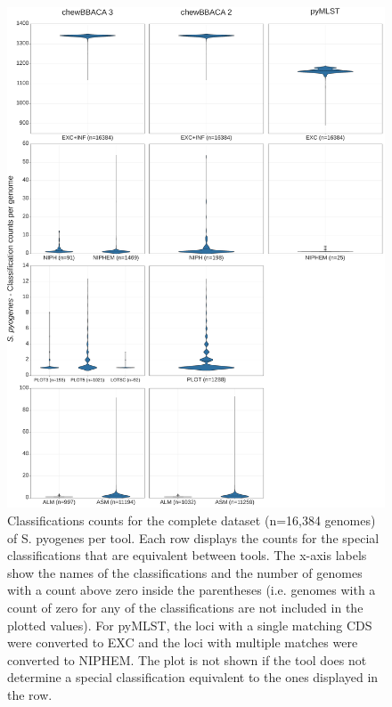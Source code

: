 \newpage
\begin{figure}[h!]
    \centering
    \includegraphics[angle=0,width=\textwidth]{figures/chapter 2/FigureS17.pdf}
    \caption{Classifications counts for the complete dataset (n=16,384 genomes) of S. pyogenes per tool. Each row displays the counts for the special classifications that are equivalent between tools. The x-axis labels show the names of the classifications and the number of genomes with a count above zero inside the parentheses (i.e. genomes with a count of zero for any of the classifications are not included in the plotted values). For pyMLST, the loci with a single matching CDS were converted to EXC and the loci with multiple matches were converted to NIPHEM. The plot is not shown if the tool does not determine a special classification equivalent to the ones displayed in the row.}
    \label{fig:chap2_figureS17}
\end{figure}

